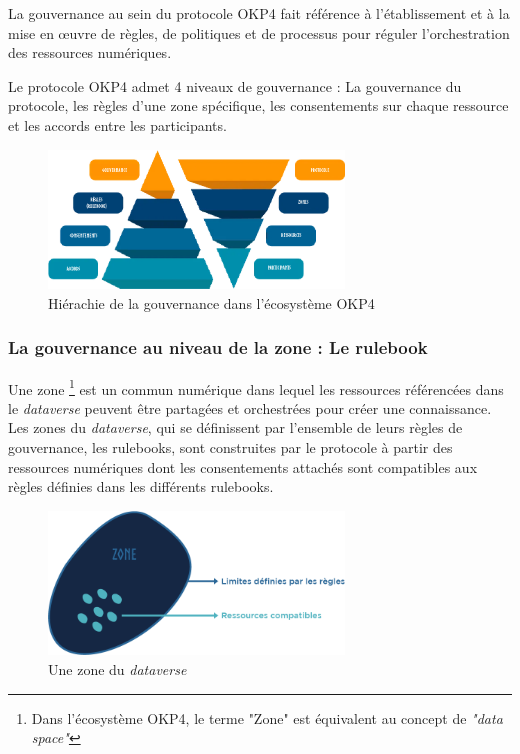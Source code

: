 La gouvernance au sein du protocole OKP4 fait référence à l'établissement et à la mise en œuvre de règles, de politiques et de processus pour réguler l'orchestration des ressources numériques.

Le protocole OKP4 admet 4 niveaux de gouvernance : La gouvernance du protocole, les règles d'une zone spécifique, les consentements sur chaque ressource et les accords entre les participants.


\begin{figure}[h]
    \centering
    \includegraphics[width=0.7\textwidth]{ILLUSTRATIONS/governance_level.png}
    \caption{Hiérachie de la gouvernance dans l'écosystème OKP4}
    \label{fig:niveau_de_gouvernance}
\end{figure}


\subsubsection{La gouvernance au niveau de la zone :  Le rulebook} \label{subsec:rulebook}

Une zone \footnote{Dans l'écosystème OKP4, le terme "Zone" est équivalent au concept de \textit{"data space"}} est un commun numérique dans lequel les ressources référencées dans le \textit{dataverse} peuvent être partagées et orchestrées pour créer une connaissance. Les zones du \textit{dataverse}, qui se définissent par l'ensemble de leurs règles de gouvernance, les rulebooks, sont construites par le protocole à partir des ressources numériques dont les consentements attachés sont compatibles aux règles définies dans les différents rulebooks.

\begin{figure}[h]
    \centering
    \includegraphics[width=0.7\textwidth]{ILLUSTRATIONS/zone.png}
    \caption{Une zone du \textit{dataverse}}
    \label{fig:zone}
\end{figure}

